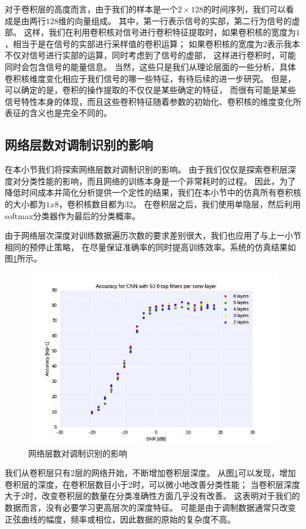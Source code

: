 对于卷积层的高度而言，由于我们的样本是一个$2\times128$的时间序列，我们可以看成是由两行$128$维的向量组成。
其中，第一行表示信号的实部，第二行为信号的虚部。
这样，我们在利用卷积核对信号进行卷积特征提取时，如果卷积核的宽度为$1$，相当于是在信号的实部进行采样值的卷积运算；
如果卷积核的宽度为$2$表示我本不仅对信号进行实部的运算，同时考虑到了信号的虚部，
这样进行卷积时，可能同时会包含信号的能量信息。
当然，这些只是我们从理论层面的一些分析，具体卷积核维度变化相应于我们信号的哪一些特征，有待后续的进一步研究。
但是，可以确定的是，卷积的操作提取的不仅仅是某些确定的特征，
而很有可能是某些信号特性本身的体现，而且这些卷积特征随着参数的初始化、卷积核的维度变化所表征的含义也是完全不同的。\par

\subsection{网络层数对调制识别的影响}

在本小节我们将探索网络层数对调制识别的影响。
由于我们仅仅是探索卷积层深度对分类性能的影响，而且网络的训练本身是一个非常耗时的过程。
因此，为了降低时间成本并简化分析提供一个定性的结果，我们在本小节中的仿真所有卷积核的大小都为$1x8$，卷积核数目都为32。
在卷积层之后，我们使用单隐层，然后利用softmax分类器作为最后的分类概率。\par
由于网络层次深度对训练数据遍历次数的要求差别很大，我们也应用了与上一小节相同的预停止策略，
在尽量保证准确率的同时提高训练效率。系统的仿真结果如图\ref{sec:fig_5_3}所示。\par
\begin{figure}[!h]
	\centering
	\includegraphics[scale=1.1]{figures/chapter_5/fig_5_3}
	\caption{网络层数对调制识别的影响}\label{sec:fig_5_3}
\end{figure}
我们从卷积层只有$2$层的网络开始，不断增加卷积层深度。
从图\ref{sec:fig_5_3}可以发现，增加卷积层的深度，在卷积层数目小于2时，可以微小地改善分类性能；
当卷积层深度大于2时，改变卷积层的数量在分类准确性方面几乎没有改善。
这表明对于我们的数据而言，没有必要学习更高层次的深度特征。
可能是由于调制数据通常只改变正弦曲线的幅度，频率或相位，因此数据的原始的复杂度不高。\par

